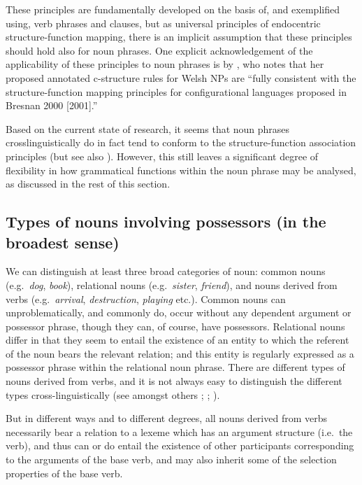 \documentclass[output=paper,hidelinks]{langscibook}
\begin{document}
These principles are fundamentally developed on the basis of, and exemplified using, verb phrases and clauses, but as universal principles of endocentric structure-function mapping, there is an implicit assumption that these principles should hold also for noun phrases. One explicit acknowledgement of the applicability of these principles to noun phrases is by \citet[94]{Sadler00}, who notes that her proposed annotated c-structure rules for Welsh NPs are ``fully consistent with the structure-function mapping principles for configurational languages proposed in Bresnan 2000 [2001].'' \nocite{bresnan2001lexical}

Based on the current state of research, it seems that noun phrases crosslinguistically do in fact tend to conform to the structure-function association principles (but see also ). However, this still leaves a significant degree of flexibility in how grammatical functions within the noun phrase may be analysed, as discussed in the rest of this section.


\subsection{Types of nouns involving possessors (in the broadest sense)}

We can distinguish at least three broad categories of noun: common nouns (e.g.\ \emph{dog}, \emph{book}), %
relational nouns (e.g.\ \emph{sister}, \emph{friend}\/), and nouns derived from verbs (e.g.\ \emph{arrival}, \emph{destruction}, \emph{playing} etc.). Common nouns can unproblematically, and commonly do, occur without any dependent argument or possessor phrase, though they can, of course, have possessors. Relational nouns differ in that they seem to entail the existence of an entity to which the referent of the noun bears the relevant relation; and this entity is regularly expressed as a possessor phrase within the relational noun phrase. There are different types of nouns derived from verbs, and it is not always easy to distinguish the different types cross-linguistically (see amongst others \citealt{Comrie76an}; \citealt{Grimshaw90};
\citealt{KoptTamm93, KoptTamm02an}).

But in different ways and to different degrees, all nouns derived from verbs necessarily bear a relation to a lexeme which has an argument structure (i.e.\ the verb), and thus can or do entail the existence of other participants corresponding to the arguments of the base verb, and may also inherit some of the selection properties of the base verb.
\end{document}
